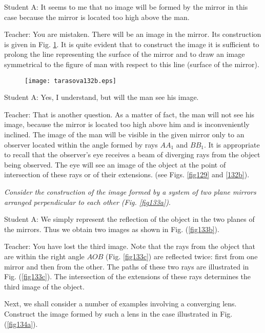 \documentclass[a4paper,12pt]{book}
\begin{document}
{{\sc Student A:} It seems to me that no image will be formed by the mirror in this case because the mirror is located too high above the man.

{\sc Teacher:} You are mistaken. There will be an image in the mirror. Its construction is given in Fig. \ref{fig132b}. It is quite evident that to construct the image it is sufficient to prolong the line representing the surface of the mirror  and to draw an image symmetrical to the figure of man with respect to this line (surface of the mirror). 
\begin{figure}[!htbp]
\begin{center}
\texttt{[image: tarasova132b.eps]}
\caption{}
\label{fig132b}
\end{center}
\end{figure}

{\sc Student A:} Yes, I understand, but will the man see his image.

{\sc Teacher:} That is another question. As a matter of fact, the man will not see his image, because the mirror is located too high above him and is inconveniently inclined. The image of the man will be visible in the given mirror only to an observer located within the angle formed by rays $AA_{1}$ and $BB_{1}$. It is appropriate to recall that the observer's eye receives a beam of diverging rays from the object being observed. The eye will see an image of the object at the point of intersection of these rays or of their extensions. (see Figs. \ref{fig129} and \ref{132b}).

\emph{Consider the construction of the image formed by a system of two plane mirrors arranged perpendicular to each other (Fig. \ref{fig133a})}.

{\sc Student A:} We simply represent the reflection of the object in the two planes of the mirrors. Thus we obtain two images as shown in Fig. (\ref{fig133b}).

{\sc Teacher:} You have lost the third image. Note that the rays from the object that are within the right angle $AOB$ (Fig. \ref{fig133c}) are reflected twice: first from one mirror and then from the other. The paths of these two rays are illustrated in Fig. (\ref{fig133c}). The intersection of the extensions of these rays determines the third image of the object.

Next, we shall consider a number of examples involving a converging lens. Construct the image formed by such a lens in the case illustrated in Fig. (\ref{fig134a}).

}
\end{document}
